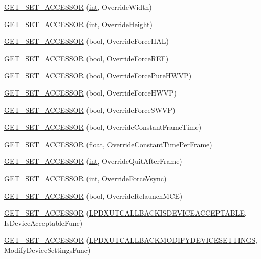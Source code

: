 \begin{DoxyCompactItemize}
\item 
\hyperlink{class_d_x_u_t_state_a9dbeab9d6c151fa2b0d3d71311939640}{GET\_\-SET\_\-ACCESSOR} (\hyperlink{_d_x_u_tgui_8cpp_a2d77ed03302b6978834ee3b6f57837fb}{int}, OverrideWidth)
\item 
\hyperlink{class_d_x_u_t_state_a5a9501d43f90b05494198179316d41da}{GET\_\-SET\_\-ACCESSOR} (\hyperlink{_d_x_u_tgui_8cpp_a2d77ed03302b6978834ee3b6f57837fb}{int}, OverrideHeight)
\item 
\hyperlink{class_d_x_u_t_state_a9a895506bdec9cae22f98d4a2da91cb1}{GET\_\-SET\_\-ACCESSOR} (bool, OverrideForceHAL)
\item 
\hyperlink{class_d_x_u_t_state_a8b63ee5a944b457d0c4eeae69f93a2a4}{GET\_\-SET\_\-ACCESSOR} (bool, OverrideForceREF)
\item 
\hyperlink{class_d_x_u_t_state_af946c3e5a8cd41dc434c5d3fe5e970de}{GET\_\-SET\_\-ACCESSOR} (bool, OverrideForcePureHWVP)
\item 
\hyperlink{class_d_x_u_t_state_a4922565ac94b61cf14981bb3e0ca2d25}{GET\_\-SET\_\-ACCESSOR} (bool, OverrideForceHWVP)
\item 
\hyperlink{class_d_x_u_t_state_acfc2391d791bf76af4853114077ff8ce}{GET\_\-SET\_\-ACCESSOR} (bool, OverrideForceSWVP)
\item 
\hyperlink{class_d_x_u_t_state_a0d6827fb6471a413367e889ee923d475}{GET\_\-SET\_\-ACCESSOR} (bool, OverrideConstantFrameTime)
\item 
\hyperlink{class_d_x_u_t_state_a22c820fde6f74295f8fd04164cf6422e}{GET\_\-SET\_\-ACCESSOR} (float, OverrideConstantTimePerFrame)
\item 
\hyperlink{class_d_x_u_t_state_afac280cfbacc515dbdea3e987bfd50a6}{GET\_\-SET\_\-ACCESSOR} (\hyperlink{_d_x_u_tgui_8cpp_a2d77ed03302b6978834ee3b6f57837fb}{int}, OverrideQuitAfterFrame)
\item 
\hyperlink{class_d_x_u_t_state_a54cd9b06bcaae901e3acdb1c3b70df3a}{GET\_\-SET\_\-ACCESSOR} (\hyperlink{_d_x_u_tgui_8cpp_a2d77ed03302b6978834ee3b6f57837fb}{int}, OverrideForceVsync)
\item 
\hyperlink{class_d_x_u_t_state_a7a41aa4832e7af0cc22e3a5e2c91c1ae}{GET\_\-SET\_\-ACCESSOR} (bool, OverrideRelaunchMCE)
\item 
\hyperlink{class_d_x_u_t_state_ab51907217fb6cb6913a5a61938a7057a}{GET\_\-SET\_\-ACCESSOR} (\hyperlink{_d_x_u_t_8h_ae2d164ed8b3156b379e09db1cbead165}{LPDXUTCALLBACKISDEVICEACCEPTABLE}, IsDeviceAcceptableFunc)
\item 
\hyperlink{class_d_x_u_t_state_ac0eb469750e15272e744bd9e558254f1}{GET\_\-SET\_\-ACCESSOR} (\hyperlink{_d_x_u_t_8h_aece7ce83d66003e12aebe05c3ae22c09}{LPDXUTCALLBACKMODIFYDEVICESETTINGS}, ModifyDeviceSettingsFunc)

\end{DoxyCompactItemize}
